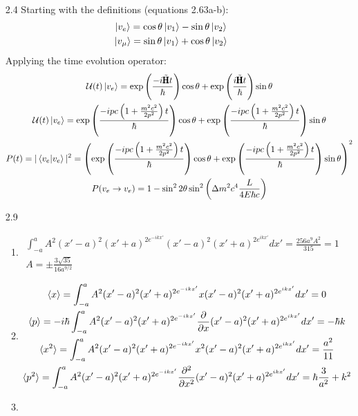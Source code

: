 \documentclass[12pt]{article}
\newcommand{\p}[2]{\frac{\partial #1}{\partial #2}}
\newcommand{\OP}[1]{\tilde{\pmb{\text{#1}}}}
\newcommand{\Fop}[1]{\mathcal{#1}}
\begin{document}
\begin{enumerate}
\begin{enumerate}
\begin{gather*}
            \end{gather*}
        \end{enumerate}
        \item[2.4] Starting with the definitions (equations 2.63a-b):
        \begin{gather*}
            \ket{v_e}=\cos\theta\ket{v_1}-\sin\theta\ket{v_2}\\
            \ket{v_{\mu}}=\sin\theta\ket{v_1}+\cos\theta\ket{v_2}
        \end{gather*}
        Applying the time evolution operator:
        \begin{gather*}
            \Fop{U}(t)\ket{v_e}=\exp\left( \frac{-i\OP{H} t}{\hbar} \right)\cos\theta+\exp\left( \frac{i\OP{H} t}{\hbar} \right)\sin\theta\\
            \Fop{U}(t)\ket{v_e}=\exp\left( \frac{-ipc\left( 1+\frac{m^2 c^2}{2p^2} \right) t}{\hbar} \right)\cos\theta+\exp\left( \frac{-ipc\left( 1+\frac{m^2 c^2}{2p^2} \right) t}{\hbar} \right)\sin\theta\\
            P(t)=|\braket{v_e|v_e}|^2=\left( \exp\left( \frac{-ipc\left( 1+\frac{m^2 c^2}{2p^2} \right) t}{\hbar} \right)\cos\theta+\exp\left( \frac{-ipc\left( 1+\frac{m^2 c^2}{2p^2} \right) t}{\hbar} \right)\sin\theta\right)^2\\
            P(v_e\rightarrow v_e)=1-\sin^2 2\theta\sin^2\left( \Delta m^2 c^4\frac{L}{4E\hbar c} \right)
        \end{gather*}
        \item[2.9]
        \begin{enumerate}
            \item
            \begin{gather*}
                \int_{-a}^{a} A^2(x'-a)^2(x'+a)^{2e^{-ikx'}}(x'-a)^2(x'+a)^{2e^{ikx'}}dx'=\frac{256 a^9 A^2}{315}=1\\
                A=\pm\frac{3 \sqrt{35}}{16 a^{9/2}}
            \end{gather*}
            \item
            \begin{gather*}
                \braket{x}=\int_{-a}^{a} A^2(x'-a)^2(x'+a)^{2e^{-ikx'}}x(x'-a)^2(x'+a)^{2e^{ikx'}}dx'=0\\
                \braket{p}=-i\hbar\int_{-a}^{a} A^2(x'-a)^2(x'+a)^{2e^{-ikx'}}\p{}{x}(x'-a)^2(x'+a)^{2e^{ikx'}}dx'=-\hbar k\\
                \braket{x^2}=\int_{-a}^{a} A^2(x'-a)^2(x'+a)^{2e^{-ikx'}}x^2(x'-a)^2(x'+a)^{2e^{ikx'}}dx'=\frac{a^2}{11}\\
                \braket{p^2}=\int_{-a}^{a} A^2(x'-a)^2(x'+a)^{2e^{-ikx'}}\p{^2}{x^2}(x'-a)^2(x'+a)^{2e^{ikx'}}dx'=\hbar\frac{3}{a^2}+k^2
            \end{gather*}
            \item
        \end{enumerate}
    \end{enumerate}
\end{document}
